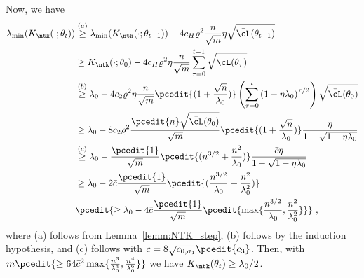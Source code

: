 Now, we have
\begin{align*}
\lambda_{\min}(K_{\ntk}(\cdot;\theta_t)) 
& \overset{(a)}{\geq} \lambda_{\min}(K_{\ntk}(\cdot;\theta_{t-1})) - 4 c_H \varrho^2 \frac{n}{\sqrt{{m}}} \eta \sqrt{\bar{\cL}(\theta_{t-1})} \\
& \geq K_{\ntk}(\cdot;\theta_0) - 4 c_H \varrho^2 \eta  \frac{n}{\sqrt{m}} \sum_{\tau=0}^{t-1}  \sqrt{\bar{\cL}(\theta_{\tau})}\\
& \overset{(b)}{\geq} \lambda_0 - 4 c_2 \varrho^2 \eta \frac{n}{ \sqrt{m}}\pcedit{(1+\frac{\sqrt{n}}{\lambda_0})} \left(\sum_{\tau=0}^t \left(1 - \eta \lambda_0 \right)^{\tau/2} \right) \sqrt{\bar{\cL}(\theta_0)}\\
& \geq \lambda_0 - 8 c_2 \varrho^2 \frac{\pcedit{n} \sqrt{\bar{\cL}(\theta_0)}}{ \sqrt{m}}\pcedit{(1+\frac{\sqrt{n}}{\lambda_0})} \frac{\eta}{1 - \sqrt{1- \eta \lambda_0}} \\
& \overset{(c)}{\geq} \lambda_0 -  \frac{\pcedit{1}}{\sqrt{m}}\pcedit{(n^{3/2}+\frac{n^2}{\lambda_0})} \frac{\bar{c} \eta }{1 - \sqrt{1- \eta \lambda_0}} \\
& \geq \lambda_0 -  2\bar{c} \frac{\pcedit{1}}{\sqrt{m}}\pcedit{(\frac{n^{3/2}}{\lambda_0}+\frac{n^2}{\lambda_0^2})}\\
&\pcedit{ \geq \lambda_0 -  4\bar{c} \frac{\pcedit{1}}{\sqrt{m}}\pcedit{\max\{\frac{n^{3/2}}{\lambda_0},\frac{n^2}{\lambda_0^2}\}}}~,
\end{align*}
%
where (a) follows from Lemma~\ref{lemm:NTK_step}, (b) follows by the induction hypothesis, and (c) follows with $\bar{c} = 8 \sqrt{c_{0,\sigma_1}} \pcedit{c_3}$. %
Then, with $m \pcedit{\geq 64\bar{c}^2\max\{\frac{n^{3}}{\lambda_0^4},\frac{n^4}{\lambda_0^6}\}}$ we have $K_{\ntk}(\theta_t) \geq \lambda_0/2$.


